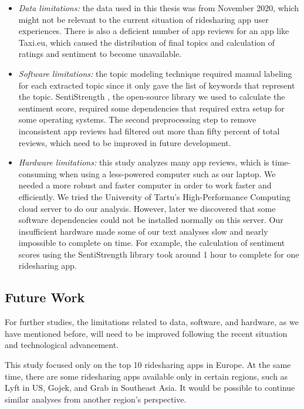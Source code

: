 \documentclass[12pt]{article}
\begin{document}
\begin{itemize}
    \item \emph{Data limitations:} the data used in this thesis was from November 2020, which might not be relevant to the current situation of ridesharing app user experiences. There is also a deficient number of app reviews for an app like Taxi.eu, which caused the distribution of final topics and calculation of ratings and sentiment to become unavailable.
    \item \emph{Software limitations:} the topic modeling technique required manual labeling for each extracted topic since it only gave the list of keywords that represent the topic. SentiStrength \cite{sentistrength}, the open-source library we used to calculate the sentiment score, required some dependencies that required extra setup for some operating systems. The second preprocessing step to remove inconsistent app reviews had filtered out more than fifty percent of total reviews, which need to be improved in future development.
    \item \emph{Hardware limitations:} this study analyzes many app reviews, which is time-consuming when using a less-powered computer such as our laptop. We needed a more robust and faster computer in order to work faster and efficiently. We tried the University of Tartu’s High-Performance Computing cloud server to do our analysis. However, later we discovered that some software dependencies could not be installed normally on this server. Our insufficient hardware made some of our text analyses slow and nearly impossible to complete on time. For example, the calculation of sentiment scores using the SentiStrength library took around 1 hour to complete for one ridesharing app.
\end{itemize}

\subsection{Future Work}
For further studies, the limitations related to data, software, and hardware, as we have mentioned before, will need to be improved following the recent situation and technological advancement.

This study focused only on the top 10 ridesharing apps in Europe. At the same time, there are some ridesharing apps available only in certain regions, such as Lyft in US, Gojek, and Grab in Southeast Asia. It would be possible to continue similar analyses from another region’s perspective.
\end{document}
